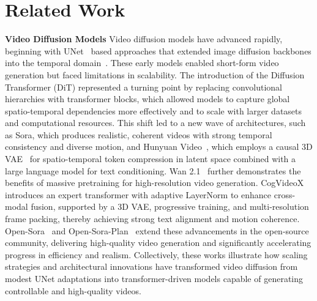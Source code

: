 \section{Related Work}
\textbf{Video Diffusion Models}
Video diffusion models have advanced rapidly, beginning with UNet~\citep{ronneberger2015u} based approaches that extended image diffusion backbones into the temporal domain~\citep{ho2022imagen,ho2022video,he2022latent,blattmann2023stable}. These early models enabled short-form video generation but faced limitations in scalability. The introduction of the Diffusion Transformer (DiT)\citep{peebles2023scalable} represented a turning point by replacing convolutional hierarchies with transformer blocks, which allowed models to capture global spatio-temporal dependencies more effectively and to scale with larger datasets and computational resources. This shift led to a new wave of architectures, such as Sora\citep{openai2024sora}, which produces realistic, coherent videos with strong temporal consistency and diverse motion, and Hunyuan Video~\citep{kong2024hunyuanvideo}, which employs a causal 3D VAE~\citep{kingma2013auto} for spatio-temporal token compression in latent space combined with a large language model for text conditioning. Wan 2.1~\citep{wan2025} further demonstrates the benefits of massive pretraining for high-resolution video generation. CogVideoX~\citep{hong2022cogvideo,yang2024cogvideox} introduces an expert transformer with adaptive LayerNorm to enhance cross-modal fusion, supported by a 3D VAE, progressive training, and multi-resolution frame packing, thereby achieving strong text alignment and motion coherence. Open-Sora~\citep{lin2024open,peng2025open} and Open-Sora-Plan~\citep{lin2024open} extend these advancements in the open-source community, delivering high-quality video generation and significantly accelerating progress in efficiency and realism. Collectively, these works illustrate how scaling strategies and architectural innovations have transformed video diffusion from modest UNet adaptations into transformer-driven models capable of generating controllable and high-quality videos.


